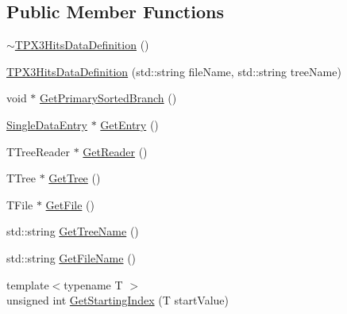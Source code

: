 \subsection*{Public Member Functions}
\begin{DoxyCompactItemize}
\item 
\hyperlink{classTPX3HitsDataDefinition_a5f5720443984a9540c111dee01736513}{$\sim$\+T\+P\+X3\+Hits\+Data\+Definition} ()
\item 
\hyperlink{classTPX3HitsDataDefinition_a255c33b607127923b72667a846132189}{T\+P\+X3\+Hits\+Data\+Definition} (std\+::string file\+Name, std\+::string tree\+Name)
\item 
void $\ast$ \hyperlink{classTPX3HitsDataDefinition_adb355446aab01960b8802df55a716c25}{Get\+Primary\+Sorted\+Branch} ()
\item 
\hyperlink{classSingleDataEntry}{Single\+Data\+Entry} $\ast$ \hyperlink{classTPX3HitsDataDefinition_acbbf89d489d6926458356f79d18ca398}{Get\+Entry} ()
\item 
T\+Tree\+Reader $\ast$ \hyperlink{classRootDataDefinition_a48a885b44c954506728f71f07d927506}{Get\+Reader} ()
\item 
T\+Tree $\ast$ \hyperlink{classRootDataDefinition_a20ed89d6d2483a0f76cd2fb131fcc597}{Get\+Tree} ()
\item 
T\+File $\ast$ \hyperlink{classRootDataDefinition_ab26897ffdd1de5e6572f6067770066b3}{Get\+File} ()
\item 
std\+::string \hyperlink{classRootDataDefinition_acc7728b0a9315cacc6b9c1fae38ed490}{Get\+Tree\+Name} ()
\item 
std\+::string \hyperlink{classRootDataDefinition_a56f206839275fdf5af290b372c4d7e13}{Get\+File\+Name} ()
\item 
{\footnotesize template$<$typename T $>$ }\\unsigned int \hyperlink{classRootDataDefinition_a1d785995aed4450ddfa97c7064cc5dfc}{Get\+Starting\+Index} (T start\+Value)
\end{DoxyCompactItemize}
